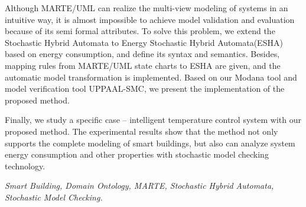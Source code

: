 Although MARTE/UML can realize the multi-view modeling of systems in an intuitive way, it is almost impossible to achieve model validation and evaluation because of its semi formal attributes. To solve this problem, we extend the Stochastic Hybrid Automata to Energy Stochastic Hybrid Automata(ESHA) based on energy consumption, and define its syntax and semantics. Besides, mapping rules from MARTE/UML state charts to ESHA are given, and the automatic model transformation is implemented. Based on our Modana tool and model verification tool UPPAAL-SMC, we present the implementation of the proposed method.

Finally, we study a specific case -- intelligent temperature control system with our proposed method. 
The experimental results show that the method not only supports the complete modeling of smart buildings, but also can analyze system energy consumption and other properties with stochastic model checking technology.

{} \textit{Smart Building, Domain Ontology, MARTE, 
Stochastic Hybrid Automata, Stochastic Model Checking.}


































